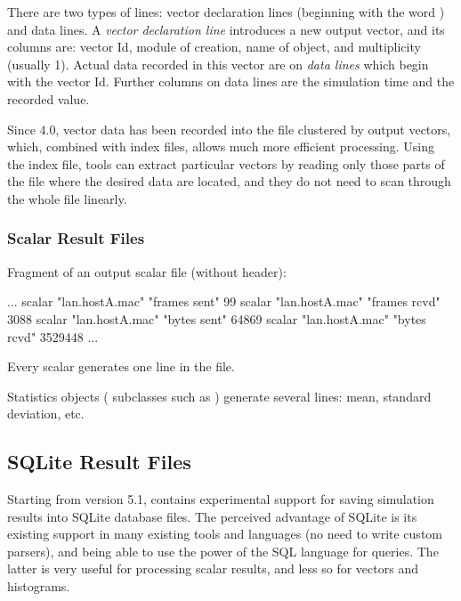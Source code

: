 There are two types of lines: vector declaration lines (beginning with the word
) and data lines. A \textit{vector declaration line}
introduces a new output vector, and its columns are: vector Id, module of
creation, name of  object, and multiplicity (usually 1).
Actual data recorded in this vector are on \textit{data lines} which begin
with the vector Id. Further columns on data lines are the simulation time
and the recorded value.


Since {\opp} 4.0, vector data has been recorded into the file clustered by
output vectors, which, combined with index files, allows much more
efficient processing. Using the index file, tools can extract particular
vectors by reading only those parts of the file where the desired data are
located, and they do not need to scan through the whole file linearly.


\subsubsection{Scalar Result Files}
\label{sec:ana-sim:scalar-result-files}

Fragment of an output scalar file (without header):

\begin{filelisting}
...
scalar "lan.hostA.mac" "frames sent"  99
scalar "lan.hostA.mac" "frames rcvd"  3088
scalar "lan.hostA.mac" "bytes sent"   64869
scalar "lan.hostA.mac" "bytes rcvd"   3529448
...
\end{filelisting}

Every scalar generates one  line in the file.

Statistics objects ( subclasses such as )
generate several lines: mean, standard deviation, etc.



\subsection{SQLite Result Files}
\label{sec:ana-sim:sqlite-result-files}

Starting from version 5.1, {\opp} contains experimental support for
saving simulation results into SQLite database files. The perceived advantage
of SQLite is its existing support in many existing tools and languages (no need to
write custom parsers), and being able to use the power of the SQL language
for queries. The latter is very useful for processing scalar results, and less
so for vectors and histograms.

